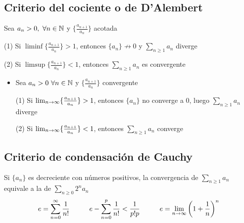 \subsection{Criterio del cociente o de D'Alembert}
Sea $a_n>0, \ \forall n\in\mathbb{N}$ y $\{\frac{a_{n+1}}{a_n}\}$ acotada

(1) Si $\liminf \{\frac{a_{n+1}}{a_n}\} > 1$, entonces $\{a_n\} \not\rightarrow 0$ y $\sum_{n\geq 1}a_n$ diverge

(2) Si $\limsup \{\frac{a_{n+1}}{a_n}\} < 1$, entonces  $\sum_{n\geq 1}a_n$ es convergente

\begin{itemize}
	\item Sea $a_n > 0 \ \forall n\in\mathbb{N}$ y $\{\frac{a_{n+1}}{a_n}\}$ convergente
	
	(1) Si $\lim_{\substack{n\rightarrow\infty}} \{\frac{a_{n+1}}{a_n}\} > 1$, entonces $\{a_n\}$ no converge a $0$, luego $\sum_{n\geq 1} a_n$ diverge
	
	(2) Si $\lim_{\substack{n\rightarrow\infty}} \{\frac{a_{n+1}}{a_n}\} < 1$,	entonces $\sum_{n\geq 1}a_n$ converge
\end{itemize}

\subsection{Criterio de condensación de Cauchy}
Si $\{a_n\}$ es decreciente con números positivos, la convergencia de $\sum_{n\geq 1} a_n$ equivale a la de $\sum_{n\geq 0}2^na_n$
$$ e = \sum_{n=0}^{\infty} \frac{1}{n!} \hspace{1cm}
e - \sum_{n=0}^{p} \frac{1}{n!} < \frac{1}{p!p} \hspace{1cm}
e = \lim_{\substack{n\rightarrow\infty}} \left(1 + \frac{1}{n}\right)^n
$$